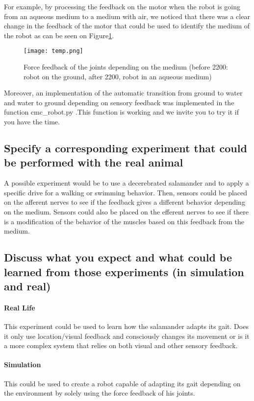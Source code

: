 \documentclass{cmc}
\begin{document}
  
  For example, by processing the feedback on the motor when the robot is going from an aqueous medium to a medium with air, we noticed that there was a clear change in the feedback of the motor that could be used to identify the medium of the robot as can be seen on Figure\ref{fig_medium}.
  
  \begin{figure}[H]
      \centering
      \texttt{[image: temp.png]}
      \caption{Force feedback of the joints depending on the medium (before 2200: robot on the ground, after 2200, robot in an aqueous medium)}
      \label{fig_medium}
  \end{figure}
  
  Moreover, an implementation of the automatic transition from ground to water and water to ground depending on sensory feedback was implemented in the function cmc\_robot.py .This function is working and we invite you to try it if you have the time.
  
\subsection{Specify a corresponding experiment that could be performed with the real animal}

A possible experiment would be to use a decerebrated salamander and to apply a specific drive for a walking or swimming behavior. Then, sensors could be placed on the afferent nerves to see if the feedback gives a different behavior depending on the medium. Sensors could also be placed on the efferent nerves to see if there is a modification of the behavior of the muscles based on this feedback from the medium. 


\subsection{Discuss what you expect and what could be learned from those experiments (in simulation and real)}

\paragraph{Real Life} This experiment could be used to learn how the salamander adapts its gait. Does it only use location/visual feedback and consciously changes its movement or is it a more complex system that relies on both visual and other sensory feedback.  
    
\paragraph{Simulation} This could be used to create a robot capable of adapting its gait depending on the environment by solely using the force feedback of his joints.
\end{document}
